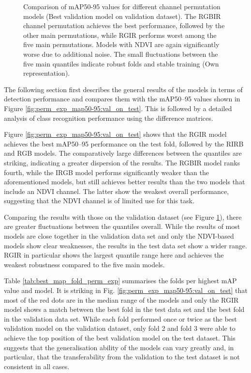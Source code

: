 \begin{figure}[b]
    \centering
    
    \caption[Comparison of \acrshort{mAP}50-95 values for different channel permutation models (Best validation model on validation dataset)]{Comparison of \acrshort{mAP}50-95 values for different channel permutation models (Best validation model on validation dataset). The RGBIR channel permutation achieves the best performance, followed by the other main permutations, while RGIR performs worst among the five main permutations. Models with NDVI are again significantly worse due to additional noise. The small fluctuations between the five main quantiles indicate robust folds and stable training (Own representation).}
    \label{fig:perm_exp_map50-95:val_on_val}
\end{figure}
The following section first describes the general results of the models in terms of detection performance and compares them with the \acrshort{mAP}50–95 values shown in Figure \ref{fig:perm_exp_map50-95:val_on_test}. This is followed by a detailed analysis of class recognition performance using the difference matrices.  

Figure \ref{fig:perm_exp_map50-95:val_on_test} shows that the RGIR model achieves the best \acrshort{mAP}50--95 performance on the test fold, followed by the RIRB and RGB models. The comparatively large differences between the quantiles are striking, indicating a greater dispersion of the results. The RGBIR model ranks fourth, while the IRGB model performs significantly weaker than the aforementioned models, but still achieves better results than the two models that include an NDVI channel. The latter show the weakest overall performance, suggesting that the NDVI channel is of limited use for this task.  

Comparing the results with those on the validation dataset (see Figure \ref{fig:perm_exp_map50-95:val_on_val}), there are greater fluctuations between the quantiles overall. While the results of most models are close together in the validation data set and only the NDVI-based models show clear weaknesses, the results in the test data set show a wider range. RGIR in particular shows the largest quantile range here and achieves the weakest robustness compared to the five main models.
 
Table \ref{tab:best_map_fold_perm_exp} summarises the folds per highest \acrshort{mAP} value and model. It is striking in Fig. \ref{fig:perm_exp_map50-95:val_on_test} that most of the red dots are in the median range of the models and only the \acrshort{RGIR} model shows a match between the best fold in the test data set and the best fold in the validation data set.  While each fold performed once or twice as the best validation model on the validation dataset, only fold 2 and fold 3 were able to achieve the top position of the best validation model on the test dataset. This suggests that the generalisation ability of the models can vary greatly and, in particular, that the transferability from the validation to the test dataset is not consistent in all cases.  

